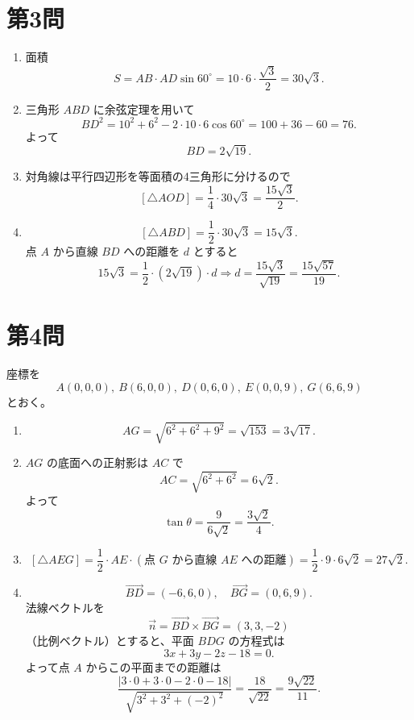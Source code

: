 \documentclass[a4paper,12pt]{jsarticle}
\begin{document}
\section*{第3問}
\begin{enumerate}[label=\arabic*.]
  \item 面積
  \[
  S=AB\cdot AD\sin60^\circ
  =10\cdot6\cdot\frac{\sqrt3}{2}
  =30\sqrt3.
  \]
  \item 三角形 \(ABD\) に余弦定理を用いて
  \[
  BD^2=10^2+6^2-2\cdot10\cdot6\cos60^\circ
  =100+36-60=76.
  \]
  よって
  \[
  BD=2\sqrt{19}.
  \]
  \item 対角線は平行四辺形を等面積の4三角形に分けるので
  \[
  [\triangle AOD]=\frac14\cdot30\sqrt3=\frac{15\sqrt3}{2}.
  \]
  \item
  \[
  [\triangle ABD]=\frac12\cdot30\sqrt3=15\sqrt3.
  \]
  点 \(A\) から直線 \(BD\) への距離を \(d\) とすると
  \[
  15\sqrt3=\frac12\cdot(2\sqrt{19})\cdot d
  \Rightarrow d=\frac{15\sqrt3}{\sqrt{19}}
  =\frac{15\sqrt{57}}{19}.
  \]
\end{enumerate}

\section*{第4問}
座標を
\[
A(0,0,0),\ B(6,0,0),\ D(0,6,0),\ E(0,0,9),\ G(6,6,9)
\]
とおく。
\begin{enumerate}[label=\arabic*.]
  \item
  \[
  AG=\sqrt{6^2+6^2+9^2}
  =\sqrt{153}=3\sqrt{17}.
  \]
  \item \(AG\) の底面への正射影は \(AC\) で
  \[
  AC=\sqrt{6^2+6^2}=6\sqrt2.
  \]
  よって
  \[
  \tan\theta=\frac{9}{6\sqrt2}=\frac{3\sqrt2}{4}.
  \]
  \item
  \[
  [\triangle AEG]
  =\frac12\cdot AE\cdot(\text{点 }G\text{ から直線 }AE\text{ への距離})
  =\frac12\cdot9\cdot6\sqrt2
  =27\sqrt2.
  \]
  \item
  \[
  \overrightarrow{BD}=(-6,6,0),\quad \overrightarrow{BG}=(0,6,9).
  \]
  法線ベクトルを
  \[
  \overrightarrow{n}=\overrightarrow{BD}\times\overrightarrow{BG}=(3,3,-2)
  \]
  （比例ベクトル）とすると、平面 \(BDG\) の方程式は
  \[
  3x+3y-2z-18=0.
  \]
  よって点 \(A\) からこの平面までの距離は
  \[
  \frac{|3\cdot0+3\cdot0-2\cdot0-18|}{\sqrt{3^2+3^2+(-2)^2}}
  =\frac{18}{\sqrt{22}}
  =\frac{9\sqrt{22}}{11}.
  \]
\end{enumerate}
\end{document}
